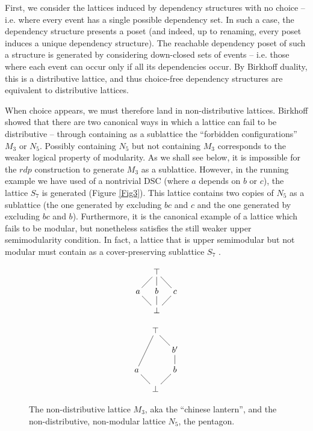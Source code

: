 \documentclass[hoptionsi,review,screen,format=acmsmall]{acmart}
\theoremstyle{definition}
\begin{document}
First, we consider the lattices induced by dependency structures with no choice -- i.e. where every event has a single possible dependency set. In such a case, the dependency structure presents a poset (and indeed, up to renaming, every poset induces a unique dependency structure). The reachable dependency poset of such a structure is generated by considering down-closed sets of events -- i.e. those where each event can occur only if all its dependencies occur. By Birkhoff duality, this is a distributive lattice, and thus choice-free dependency structures are equivalent to distributive lattices.

When choice appears, we must therefore land in non-distributive lattices. Birkhoff showed that there are two canonical ways in which a lattice can fail to be distributive -- through containing as a sublattice the ``forbidden configurations'' \(M_3\) or \(N_5\). Possibly containing \(N_5\) but not containing \(M_3\) corresponds to the weaker logical property of modularity. As we shall see below, it is impossible for the \(rdp\) construction to generate \(M_3\) as a sublattice. However, in the running example we have used of a nontrivial DSC (where \(a\) depends on \(b\) or \(c\)), the lattice \(S_7\) is generated (Figure \ref{Fig3}). This lattice contains two copies of \(N_5\) as a sublattice (the one generated by excluding \(bc\) and \(c\) and the one generated by excluding \(bc\) and \(b\)). Furthermore, it is the canonical example of a lattice which fails to be modular, but nonetheless satisfies the still weaker upper semimodularity condition. In fact, a lattice that is upper semimodular but not modular must contain as a cover-preserving sublattice \(S_7\)  \cite{stern1999semimodular}. 

\begin{figure}
\begin{minipage}[c]{0.3\textwidth}
\begin{equation*}
    \xymatrix@=1em{& \top \ar@{-}[dl] \ar@{-}[d] \ar@{-}[dr] & \\
      a \ar@{-}[dr] & b \ar@{-}[d] & c \ar@{-}[dl]  \\
       & \bot &}
\end{equation*}
\end{minipage}
\begin{minipage}[c]{0.3\textwidth}
\begin{equation*}
    \xymatrix@=1em{& \top \ar@{-}[ddl] \ar@{-}[dr] & \\
      & & b'  \ar@{-}[d]  \\
      a \ar@{-}[dr] & & b \ar@{-}[dl] \\
      & \bot &}
\end{equation*}
\end{minipage}

\caption{The non-distributive lattice \(M_3\), aka the ``chinese lantern'', and the non-distributive, non-modular lattice \(N_5\), the pentagon.}
\label{Fig2}
\end{figure}
\end{document}
